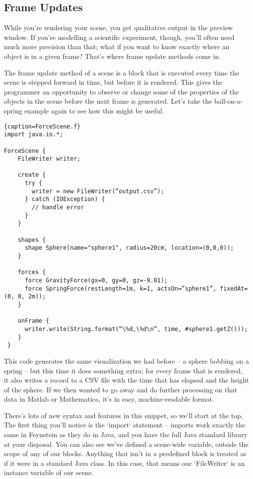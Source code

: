 \subsection{Frame Updates}

While you're rendering your scene, you get qualitative output in the
preview window. If you're modelling a scientific experiment, though,
you'll often need much more precision than that; what if you want to
know exactly where an object is in a given frame? That's where frame
update methods come in.

The frame update method of a scene is a block that is executed every
time the scene is stepped forward in time, but before it is
rendered. This gives the programmer an opportunity to observe or
change some of the properties of the objects in the scene before the
next frame is generated. Let's take the ball-on-a-spring example again
to see how this might be useful.

\begin{lstlisting}{caption=ForceScene.f}
import java.io.*;

ForceScene {
    FileWriter writer;

    create {
      try {
        writer = new FileWriter(“output.csv”);
      } catch (IOException) {
        // handle error
      }
    }

    shapes {
      shape Sphere(name="sphere1", radius=20cm, location=(0,0,0));
    }

    forces {
      force GravityForce(gx=0, gy=0, gz=-9.81);
      force SpringForce(restLength=1m, k=1, actsOn=”sphere1”, fixedAt=(0, 0, 2m));
    }

    onFrame {
      writer.write(String.format(“\%d,\%d\n”, time, #sphere1.getZ()));
    }
 }
\end{lstlisting}

This code generates the same visualization we had before -- a sphere
bobbing on a spring -- but this time it does something extra; for
every frame that is rendered, it also writes a record to a CSV file
with the time that has elapsed and the height of the sphere. If we
then wanted to go away and do further processing on that data in
Matlab or Mathematica, it's in easy, machine-readable format.

There's lots of new syntax and features in this snippet, so we'll
start at the top. The first thing you'll notice is the `import`
statement -- imports work exactly the same in Feynstein as they do in
Java, and you have the full Java standard library at your
disposal. You can also see we've defined a scene-wide variable,
outside the scope of any of our blocks. Anything that isn't in a
predefined block is treated as if it were in a standard Java class. In
this case, that means our `FileWriter` is an instance variable of our
scene.

